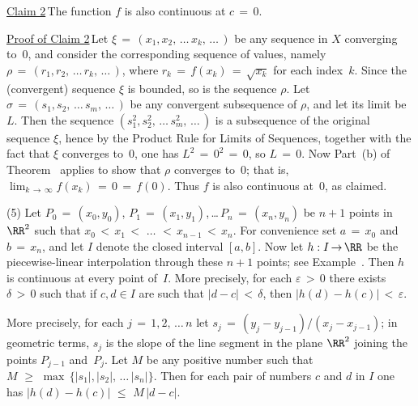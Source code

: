         \underline{Claim 2}\,The function $f$ is also continuous at $c \,=\, 0$.

        \underline{Proof of Claim 2}\,Let ${\xi} \,=\, (x_{1}, x_{2},\,{\ldots}\,x_{k},\,{\ldots}\,)$ be any sequence in $X$ converging to~$0$,
    and consider the corresponding sequence of values, namely ${\rho} \,=\, (r_{1}, r_{2},\,{\ldots}\,r_{k},\,{\ldots}\,)$,
    where $r_{k} \,=\,f(x_{k}) \,=\, \sqrt{x_{k}}$ for each index~$k$. Since the (convergent) sequence ${\xi}$ is bounded, so is the sequence ${\rho}$.
    Let ${\sigma} \,=\, (s_{1}, s_{2},\,{\ldots}\,s_{m},\,{\ldots}\,)$ be any convergent subsequence of ${\rho}$, and let its limit be~$L$.
    Then the sequence $(s_{1}^{2}, s_{2}^{2},\,{\ldots}\,s_{m}^{2},\,{\ldots}\,)$ is a subsequence of the original sequence ${\xi}$,
    hence by the Product Rule for Limits of Sequences, together with the fact that ${\xi}$ converges to~$0$,
    one has $L^{2} \,=\, 0^{2} \,=\, 0$, so $L \,=\, 0$. Now Part~(b) of Theorem~ applies to show that ${\rho}$ converges to~$0$;
    that is, $\lim_{k \,{\rightarrow}\, {\infty}} f(x_{k}) \,=\, 0 \,=\, f(0)$. Thus $f$ is also continuous at~$0$, as claimed.

\V
        (5) Let $P_{0} \,=\, (x_{0}, y_{0})$, $P_{1} \,=\, (x_{1},y_{1})$,\,{\ldots}\,$P_{n} \,=\, (x_{n},y_{n})$
    be $n+1$ points in ${\RR}^{2}$ such that $x_{0}\,<\,x_{1}\,<\,\,{\ldots}\,\,<\,x_{n-1}\,<\,x_{n}$. For convenience set $a \,=\, x_{0}$ and $b \,=\, x_{n}$, and let $I$ denote the closed interval $[a,b]$.
    Now let $h:I \,{\rightarrow}\, {\RR}$ be the piecewise-linear interpolation through these $n+1$ points; see Example~. Then $h$ is continuous at every point of~$I$.
    More precisely, for each ${\varepsilon}\,>\,0$ there exists ${\delta}\,>\,0$ such that if $c,d{\in}I$ are such that $|d-c|\,<\,{\delta}$, then $|h(d)-h(c)|\,<\,{\varepsilon}$.

        More precisely, for each $j \,=\, 1,2,\,{\ldots}\,n$ let $s_{j} \,=\, (y_{j}-y_{j-1})/(x_{j}-x_{j-1})$;
    in geometric terms, $s_{j}$ is the slope of the line segment in the plane ${\RR}^{2}$ joining the points $P_{j-1}$ and~$P_{j}$.
    Let $M$ be any positive number such that $M\,\,{\geq}\,\,\max\,\{|s_{1}|, |s_{2}|,\,{\ldots}\,|s_{n}|\}$.
    Then for each pair of numbers $c$ and $d$ in $I$ one has $|h(d)-h(c)|\,\,{\leq}\,\,M\,|d-c|$.

